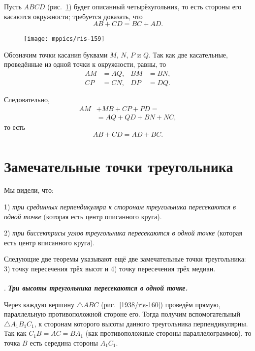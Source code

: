 \documentclass[twoside]{book}
\begin{document}
Пусть $ABCD$ (рис.~\ref{1938/ris-159}) будет описанный четырёхугольник, то есть стороны его касаются окружности;
требуется доказать, что 
\[AB+CD=BC+AD.\]

\begin{figure}
\centering
\texttt{[image: mppics/ris-159]}
\caption{}\label{1938/ris-159}
\end{figure}

Обозначим точки касания буквами $M$, $N$, $P$ и $Q$.
Так как две касательные, проведённые из одной точки к окружности, равны, то 
\begin{align*}
AM&=AQ,& BM&=BN,
\\
CP&=CN, & DP &= DQ.
\end{align*}

Следовательно,
\begin{align*}
AM&+MB+CP+PD = 
\\
&=AQ + QD+BN+NC,
\end{align*}
то есть 
\[AB+CD=AD+BC.\]


\section{Замечательные точки треугольника}

\paragraph{}\label{1938/141}
Мы видели, что:

1) \emph{три срединных перпендикуляра к сторонам треугольника пересекаются в одной точке} (которая есть центр описанного круга). 

2) \emph{три биссектрисы углов треугольника пересекаются в одной точке} (которая есть центр вписанного круга).

Следующие две теоремы указывают ещё две замечательные точки треугольника:
3) точку пересечения трёх высот и 4) точку пересечения трёх медиан.

\paragraph{}\label{1938/142}
.
\textbf{\emph{Три высоты треугольника пересекаются в одной точке.}}

Через каждую вершину $\triangle ABC$ (рис.~\ref{1938/ris-160}) проведём прямую, параллельную противоположной стороне его.
Тогда получим вспомогательный $\triangle A_1B_1C_1$, к сторонам которого высоты данного треугольника перпендикулярны.
Так как $C_1B=AC=BA_1$ (как противоположные стороны параллелограммов), то точка $B$ есть середина стороны $A_1C_1$.
\end{document}
